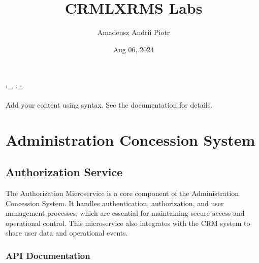 \documentclass[letterpaper,10pt,english]{sphinxmanual}
\title{CRMLXRMS Labs}
\date{Aug 06, 2024}
\author{Amadeusz Andrii Piotr}
\begin{document}
\ifdefined\shorthandoff
  \ifnum\catcode`\=\string=\active\shorthandoff{=}\fi
  \ifnum\catcode`\"=\active{}\fi
\fi

\pagestyle{empty}
\sphinxmaketitle
\pagestyle{plain}
\sphinxtableofcontents
\pagestyle{normal}
\label{\detokenize{index::doc}}


\sphinxAtStartPar
Add your content using  syntax. See the
documentation for details.

\sphinxstepscope


\chapter{Administration Concession System}
\label{\detokenize{administration_concession_system/index:administration-concession-system}}\label{\detokenize{administration_concession_system/index::doc}}
\sphinxstepscope


\section{Authorization Service}
\label{\detokenize{administration_concession_system/authorization_service:authorization-service}}\label{\detokenize{administration_concession_system/authorization_service::doc}}
\sphinxAtStartPar
The Authorization Microservice is a core component of the Administration Concession System. It handles authentication, authorization, and user management processes, which are essential for maintaining secure access and operational control. This microservice also integrates with the CRM system to share user data and operational events.


\subsection{API Documentation}
\label{\detokenize{administration_concession_system/authorization_service:api-documentation}}
\end{document}
